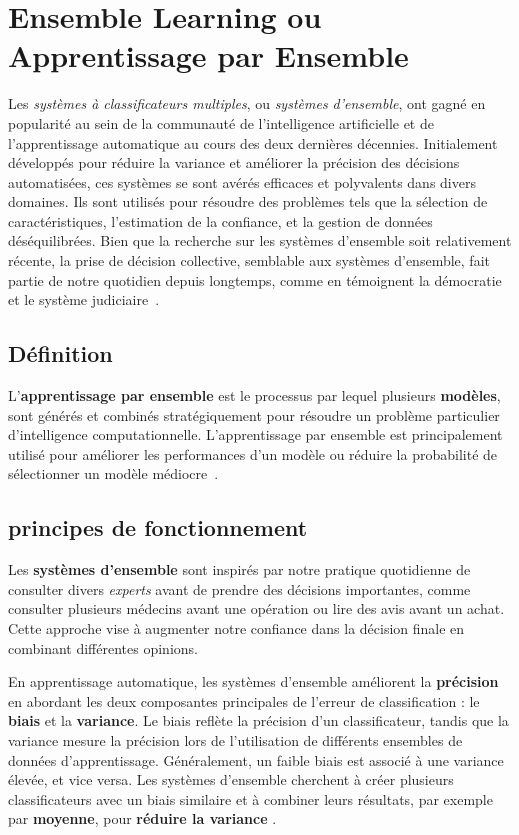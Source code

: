 \section{Ensemble Learning ou Apprentissage par Ensemble}
Les \textit{systèmes à classificateurs multiples}, ou \textit{systèmes d'ensemble}, ont gagné en popularité au sein de la communauté de l'intelligence artificielle et de l'apprentissage automatique au cours des deux dernières décennies. Initialement développés pour réduire la variance et améliorer la précision des décisions automatisées, ces systèmes se sont avérés efficaces et polyvalents dans divers domaines. Ils sont utilisés pour résoudre des problèmes tels que la sélection de caractéristiques, l'estimation de la confiance, et la gestion de données déséquilibrées. Bien que la recherche sur les systèmes d'ensemble soit relativement récente, la prise de décision collective, semblable aux systèmes d'ensemble, fait partie de notre quotidien depuis longtemps, comme en témoignent la démocratie et le système judiciaire~\cite{polikar2012ensemble}.

\subsection{Définition}
L'\textbf{apprentissage par ensemble} est le processus par lequel plusieurs \textbf{modèles}, sont générés et combinés stratégiquement pour résoudre un problème particulier d'intelligence computationnelle. L'apprentissage par ensemble est principalement utilisé pour améliorer les performances d'un modèle ou réduire la probabilité de sélectionner un modèle médiocre~\cite{Machine2020Batta}. 

\subsection{principes de fonctionnement}
Les \textbf{systèmes d'ensemble} sont inspirés par notre pratique quotidienne de consulter divers \textit{experts} avant de prendre des décisions importantes, comme consulter plusieurs médecins avant une opération ou lire des avis avant un achat. Cette approche vise à augmenter notre confiance dans la décision finale en combinant différentes opinions.

En apprentissage automatique, les systèmes d'ensemble améliorent la \textbf{précision} en abordant les deux composantes principales de l'erreur de classification : le \textbf{biais} et la \textbf{variance}. Le biais reflète la précision d'un classificateur, tandis que la variance mesure la précision lors de l'utilisation de différents ensembles de données d'apprentissage. Généralement, un faible biais est associé à une variance élevée, et vice versa. Les systèmes d'ensemble cherchent à créer plusieurs classificateurs avec un biais similaire et à combiner leurs résultats, par exemple par \textbf{moyenne}, pour \textbf{réduire la variance} \cite{polikar2012ensemble}.


